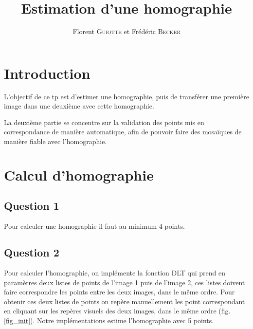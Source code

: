 \documentclass{article}
\author{Florent \textsc{Guiotte} et Frédéric \textsc{Becker}}
\title{Estimation d'une homographie}
\begin{document}
\maketitle
\tableofcontents

\section{Introduction}

L'objectif de ce tp est d'estimer une homographie, puis de transférer une première image dans une deuxième avec cette
homographie. 

La deuxième partie se concentre sur la validation des points mis en correspondance de manière automatique,
afin de pouvoir faire des mosaïques de manière fiable avec l'homographie.

\section{Calcul d'homographie}

\subsection{Question 1}
Pour calculer une homographie il faut au minimum 4 points.

\subsection{Question 2}
Pour calculer l'homographie, on implémente la fonction DLT qui prend en paramètres deux listes de points
de l'image 1 puis de l'image 2, ces listes doivent faire correspondre les points entre les deux images, dans
le même ordre. Pour obtenir ces deux listes de points on repère manuellement les point correspondant en
cliquant sur les repères visuels des deux images, dans le même ordre (fig. \ref{fig_init}). Notre implémentations estime
l'homographie avec 5 points.
\end{document}
